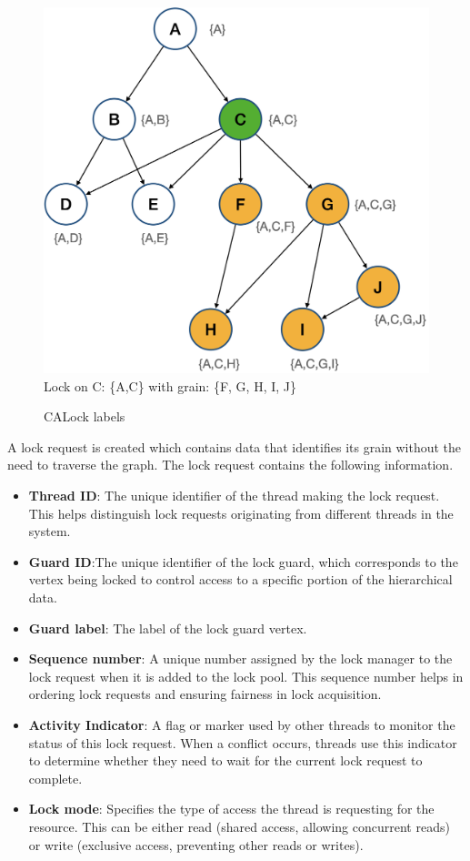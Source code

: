 \begin{figure}[h]
	\centering
	\captionsetup{justification=centering}
	\includegraphics[width=.6\columnwidth]{figures/CALockExample_locked.png}\\
	{\small
		Lock on C: \{A,C\} with grain: \{F, G, H, I, J\}
	}
	\caption{CALock labels}
	\label{calockexample}
\end{figure}

A lock request is created which contains data that identifies its grain without the need to traverse the graph. The lock request contains the following information.

\begin{itemize}
	\item \textbf{Thread ID}: The unique identifier of the thread making the lock request. This helps distinguish lock requests originating from different threads in the system.
	\item \textbf{Guard ID}:The unique identifier of the lock guard, which corresponds to the vertex being locked to control access to a specific portion of the hierarchical data.
	\item \textbf{Guard label}: The label of the lock guard vertex.
	\item \textbf{Sequence number}: A unique number assigned by the lock manager to the lock request when it is added to the lock pool. This sequence number helps in ordering lock requests and ensuring fairness in lock acquisition.
	\item \textbf{Activity Indicator}: A flag or marker used by other threads to monitor the status of this lock request. When a conflict occurs, threads use this indicator to determine whether they need to wait for the current lock request to complete.
	\item \textbf{Lock mode}: Specifies the type of access the thread is requesting for the resource. This can be either read (shared access, allowing concurrent reads) or write (exclusive access, preventing other reads or writes).
\end{itemize}

